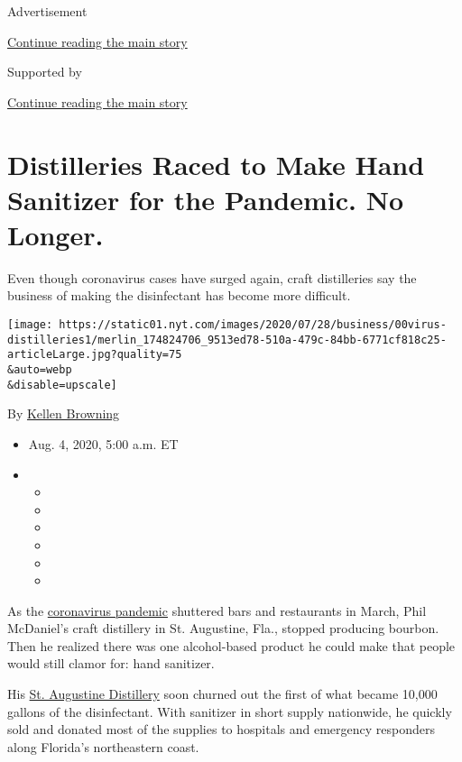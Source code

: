 Advertisement

\protect\hyperlink{after-top}{Continue reading the main story}

Supported by

\protect\hyperlink{after-sponsor}{Continue reading the main story}

\hypertarget{distilleries-raced-to-make-hand-sanitizer-for-the-pandemic-no-longer}{%
\section{Distilleries Raced to Make Hand Sanitizer for the Pandemic. No
Longer.}\label{distilleries-raced-to-make-hand-sanitizer-for-the-pandemic-no-longer}}

Even though coronavirus cases have surged again, craft distilleries say
the business of making the disinfectant has become more difficult.

\texttt{[image: https://static01.nyt.com/images/2020/07/28/business/00virus-distilleries1/merlin\_174824706\_9513ed78-510a-479c-84bb-6771cf818c25-articleLarge.jpg?quality=75\\\&auto=webp\\\&disable=upscale]}

By \href{https://www.nytimes.com/by/kellen-browning}{Kellen Browning}

\begin{itemize}
\item
  Aug. 4, 2020, 5:00 a.m. ET
\item
  \begin{itemize}
  \item
  \item
  \item
  \item
  \item
  \item
  \end{itemize}
\end{itemize}

As the
\href{https://www.nytimes.com/news-event/coronavirus?action=click\&pgtype=Article\&state=default\&module=styln-coronavirus\&region=TOP_BANNER\&context=storylines_menu}{coronavirus
pandemic} shuttered bars and restaurants in March, Phil McDaniel's craft
distillery in St. Augustine, Fla., stopped producing bourbon. Then he
realized there was one alcohol-based product he could make that people
would still clamor for: hand sanitizer.

His \href{http://staugustinedistillery.com/}{St. Augustine Distillery}
soon churned out the first of what became 10,000 gallons of the
disinfectant. With sanitizer in short supply nationwide, he quickly sold
and donated most of the supplies to hospitals and emergency responders
along Florida's northeastern coast.

